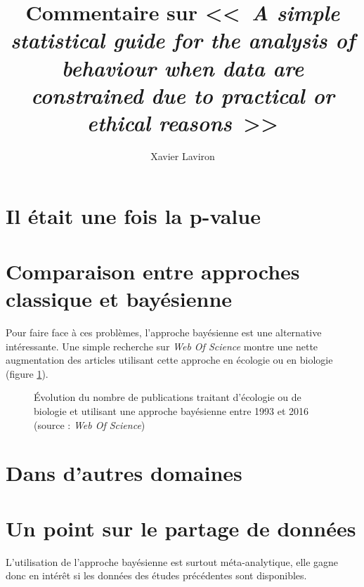 \documentclass[11pt,twocolumn,twoside]{bopHomework}
\title{Commentaire sur <<~\textit{A simple statistical guide for the analysis
  of behaviour when data are constrained due to practical or ethical
  reasons}~>> \cite{garamszegi2016}
}
\author{Xavier Laviron}
\begin{document}
\maketitle


\section{Il était une fois la p-value}


\section{Comparaison entre approches classique et bayésienne}

Pour faire face à ces problèmes, l'approche bayésienne est une alternative
intéressante.
Une simple recherche sur \textit{Web Of Science} montre une nette augmentation
des articles utilisant cette approche en écologie ou en biologie (figure
\ref{fig:bibliométrie}).

\begin{figure}[h]
  \centering{\graphfont}
  \caption{Évolution du nombre de publications traitant d'écologie ou de
    biologie et utilisant une approche bayésienne entre 1993 et 2016 (source :
    \textit{Web Of Science})}
  \label{fig:bibliométrie}
\end{figure}


\section{Dans d'autres domaines}


\section{Un point sur le partage de données}

L'utilisation de l'approche bayésienne est surtout méta-analytique, elle gagne
donc en intérêt si les données des études précédentes sont disponibles.


\begin{footnotesize}
  
\end{footnotesize}
\end{document}
